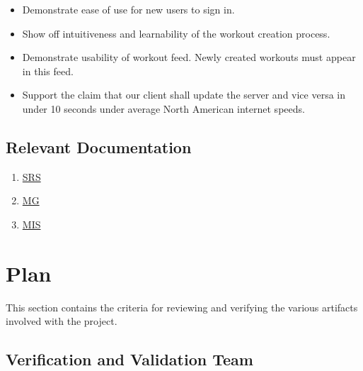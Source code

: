 \documentclass[12pt, titlepage]{article}
\begin{document}
		\begin{itemize}
			\item Demonstrate ease of use for new users to sign in.
			\item Show off intuitiveness and learnability of the workout creation process.
			\item Demonstrate usability of workout feed. Newly created workouts must appear in this feed.
			\item Support the claim that our client shall update the server and vice versa in under 10 seconds under average North American internet speeds.
		\end{itemize}

	\subsection{Relevant Documentation}

	\begin{enumerate}
		\item \href{https://github.com/dimitritsampiras/olympian/blob/main/docs/SRS/SRS.pdf}{SRS} 
		\item \href{https://github.com/dimitritsampiras/olympian/blob/main/docs/Design/MG/MG.pdf}{MG} 
		\item \href{https://github.com/dimitritsampiras/olympian/blob/main/docs/Design/MIS/MIS.pdf}{MIS} 
	\end{enumerate}
	
	
	\section{Plan}

	This section contains the criteria for reviewing and verifying the various artifacts involved with the project.
	
	
	\subsection{Verification and Validation Team}

\end{document}
